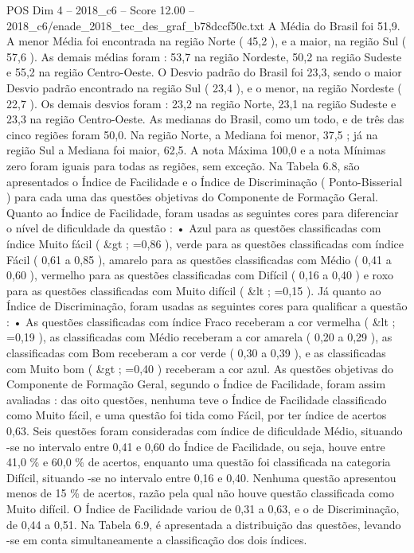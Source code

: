 \begin{textsample}{POS Dim 4 – 2018\_c6 – Score 12.00 – 2018\_c6/enade\_2018\_tec\_des\_graf\_b78dccf50c.txt}
A Média do Brasil foi 51,9.
A menor Média foi encontrada na região Norte ( 45,2 ), e a maior, na região Sul ( 57,6 ).
As demais médias foram : 53,7 na região Nordeste, 50,2 na região Sudeste e 55,2 na região Centro-Oeste.
O Desvio padrão do Brasil foi 23,3, sendo o maior Desvio padrão encontrado na região Sul ( 23,4 ), e o menor, na região Nordeste ( 22,7 ).
Os demais desvios foram : 23,2 na região Norte, 23,1 na região Sudeste e 23,3 na região Centro-Oeste.
As medianas do Brasil, como um todo, e de três das cinco regiões foram 50,0.
Na região Norte, a Mediana foi menor, 37,5 ; já na região Sul a Mediana foi maior, 62,5.
A nota Máxima 100,0 e a nota Mínimas zero foram iguais para todas as regiões, sem exceção.
Na Tabela 6.8, são apresentados o Índice de Facilidade e o Índice de Discriminação ( Ponto-Bisserial ) para cada uma das questões objetivas do Componente de Formação Geral.
Quanto ao Índice de Facilidade, foram usadas as seguintes cores para diferenciar o nível de dificuldade da questão : • Azul para as questões classificadas com índice Muito fácil ( \&gt ; =0,86 ), verde para as questões classificadas com índice Fácil ( 0,61 a 0,85 ), amarelo para as questões classificadas com Médio ( 0,41 a 0,60 ), vermelho para as questões classificadas com Difícil ( 0,16 a 0,40 ) e roxo para as questões classificadas com Muito difícil ( \&lt ; =0,15 ).
Já quanto ao Índice de Discriminação, foram usadas as seguintes cores para qualificar a questão : • As questões classificadas com índice Fraco receberam a cor vermelha ( \&lt ; =0,19 ), as classificadas com Médio receberam a cor amarela ( 0,20 a 0,29 ), as classificadas com Bom receberam a cor verde ( 0,30 a 0,39 ), e as classificadas com Muito bom ( \&gt ; =0,40 ) receberam a cor azul.
As questões objetivas do Componente de Formação Geral, segundo o Índice de Facilidade, foram assim avaliadas : das oito questões, nenhuma teve o Índice de Facilidade classificado como Muito fácil, e uma questão foi tida como Fácil, por ter índice de acertos 0,63.
Seis questões foram consideradas com índice de dificuldade Médio, situando -se no intervalo entre 0,41 e 0,60 do Índice de Facilidade, ou seja, houve entre 41,0 \% e 60,0 \% de acertos, enquanto uma questão foi classificada na categoria Difícil, situando -se no intervalo entre 0,16 e 0,40.
Nenhuma questão apresentou menos de 15 \% de acertos, razão pela qual não houve questão classificada como Muito difícil.
O Índice de Facilidade variou de 0,31 a 0,63, e o de Discriminação, de 0,44 a 0,51.
Na Tabela 6.9, é apresentada a distribuição das questões, levando -se em conta simultaneamente a classificação dos dois índices.

\end{textsample}
